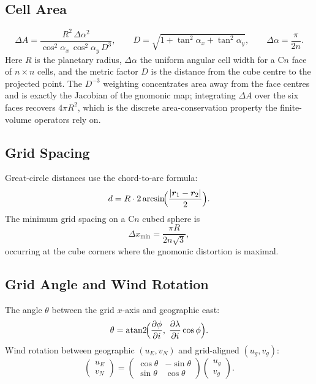\documentclass[11pt,twoside]{report}
\newcommand{\pp}{\partial}
\newcommand{\vect}[1]{\bm{#1}}
\begin{document}
\subsection{Cell Area}
\begin{equation}
  \Delta A = \frac{R^2\,\Delta\alpha^2}
    {\cos^2\!\alpha_x\,\cos^2\!\alpha_y\,D^3},
  \qquad D = \sqrt{1+\tan^2\!\alpha_x+\tan^2\!\alpha_y},
  \qquad \Delta\alpha=\frac{\pi}{2n}.
\end{equation}
Here $R$ is the planetary radius, $\Delta\alpha$ the uniform angular cell width
for a C$n$ face of $n\times n$ cells, and the metric factor $D$ is the distance
from the cube centre to the projected point.  The $D^{-3}$ weighting concentrates
area away from the face centres and is exactly the Jacobian of the gnomonic map;
integrating $\Delta A$ over the six faces recovers $4\pi R^2$, which is the
discrete area-conservation property the finite-volume operators rely on.

\subsection{Grid Spacing}

Great-circle distances use the chord-to-arc formula:
\begin{equation}
  d = R\cdot 2\arcsin\!\Bigl(\frac{|\vect{r}_1-\vect{r}_2|}{2}\Bigr).
\end{equation}
The minimum grid spacing on a C$n$ cubed sphere is
\begin{equation}
  \Delta x_{\min} = \frac{\pi R}{2n\sqrt{3}},
\end{equation}
occurring at the cube corners where the gnomonic distortion is maximal.

\subsection{Grid Angle and Wind Rotation}

The angle $\theta$ between the grid $x$-axis and geographic east:
\begin{equation}
  \theta = \mathrm{atan2}\!\Bigl(\frac{\pp\phi}{\pp i},\;
  \frac{\pp\lambda}{\pp i}\cos\phi\Bigr).
\end{equation}
Wind rotation between geographic $(u_E,v_N)$ and grid-aligned $(u_g,v_g)$:
\begin{equation}
  \begin{pmatrix}u_E\\v_N\end{pmatrix}
  =\begin{pmatrix}\cos\theta&-\sin\theta\\\sin\theta&\cos\theta\end{pmatrix}
  \begin{pmatrix}u_g\\v_g\end{pmatrix}.
\end{equation}
\end{document}
